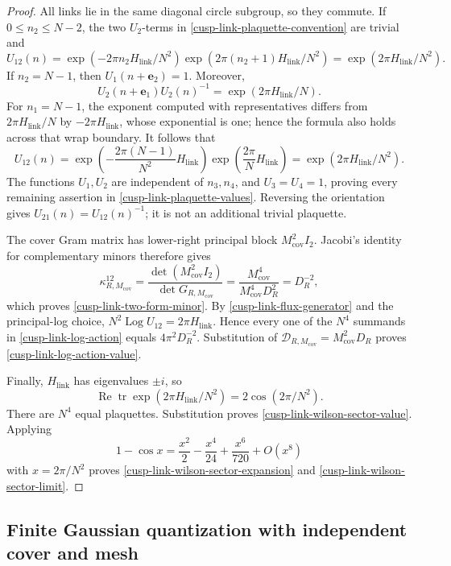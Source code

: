 \begin{proof}
All links lie in the same diagonal circle subgroup, so they commute.  If
\(0\leq n_2\leq N-2\), the two \(U_2\)-terms in
\eqref{cusp-link-plaquette-convention} are trivial and
\[
 U_{12}(n)=
 \exp(-2\pi n_2H_{\mathrm{link}}/N^2)
 \exp(2\pi(n_2+1)H_{\mathrm{link}}/N^2)
 =\exp(2\pi H_{\mathrm{link}}/N^2).
\]
If \(n_2=N-1\), then \(U_1(n+\mathbf e_2)=1\).  Moreover,
\[
 U_2(n+\mathbf e_1)U_2(n)^{-1}=\exp(2\pi H_{\mathrm{link}}/N).
\]
For \(n_1=N-1\), the exponent computed with representatives differs from
\(2\pi H_{\mathrm{link}}/N\) by \(-2\pi H_{\mathrm{link}}\), whose exponential is one; hence the formula
also holds across that wrap boundary.  It follows that
\[
 U_{12}(n)=
 \exp\left(-\frac{2\pi(N-1)}{N^2}H_{\mathrm{link}}\right)
 \exp\left(\frac{2\pi}{N}H_{\mathrm{link}}\right)
 =\exp(2\pi H_{\mathrm{link}}/N^2).
\]
The functions \(U_1,U_2\) are independent of \(n_3,n_4\), and
\(U_3=U_4=1\), proving every remaining assertion in
\eqref{cusp-link-plaquette-values}.  Reversing the orientation gives
\(U_{21}(n)=U_{12}(n)^{-1}\); it is not an additional trivial plaquette.

The cover Gram matrix has lower-right principal block
\(M_{\mathrm{cov}}^2I_2\).  Jacobi's identity for complementary minors
therefore gives
\[
 \kappa^{12}_{R,M_{\mathrm{cov}}}
 =\frac{\det(M_{\mathrm{cov}}^2I_2)}
        {\det G_{R,M_{\mathrm{cov}}}}
 =\frac{M_{\mathrm{cov}}^4}{M_{\mathrm{cov}}^4D_R^2}
 =D_R^{-2},
\]
which proves \eqref{cusp-link-two-form-minor}.  By
\eqref{cusp-link-flux-generator} and the principal-log choice,
\(N^2\operatorname{Log}U_{12}=2\pi H_{\mathrm{link}}\).  Hence every one of the \(N^4\)
summands in \eqref{cusp-link-log-action} equals
\(4\pi^2D_R^{-2}\).  Substitution of
\(\mathcal D_{R,M_{\mathrm{cov}}}=M_{\mathrm{cov}}^2D_R\) proves
\eqref{cusp-link-log-action-value}.

Finally, \(H_{\mathrm{link}}\) has eigenvalues \(\pm i\), so
\[
 \operatorname{Re}\operatorname{tr}\exp(2\pi H_{\mathrm{link}}/N^2)
 =2\cos(2\pi/N^2).
\]
There are \(N^4\) equal plaquettes.  Substitution proves
\eqref{cusp-link-wilson-sector-value}.  Applying
\[
 1-\cos x=\frac{x^2}{2}-\frac{x^4}{24}
           +\frac{x^6}{720}+O(x^8)
\]
with \(x=2\pi/N^2\) proves
\eqref{cusp-link-wilson-sector-expansion} and
\eqref{cusp-link-wilson-sector-limit}.
\end{proof}

\subsection{Finite Gaussian quantization with independent cover and mesh}


